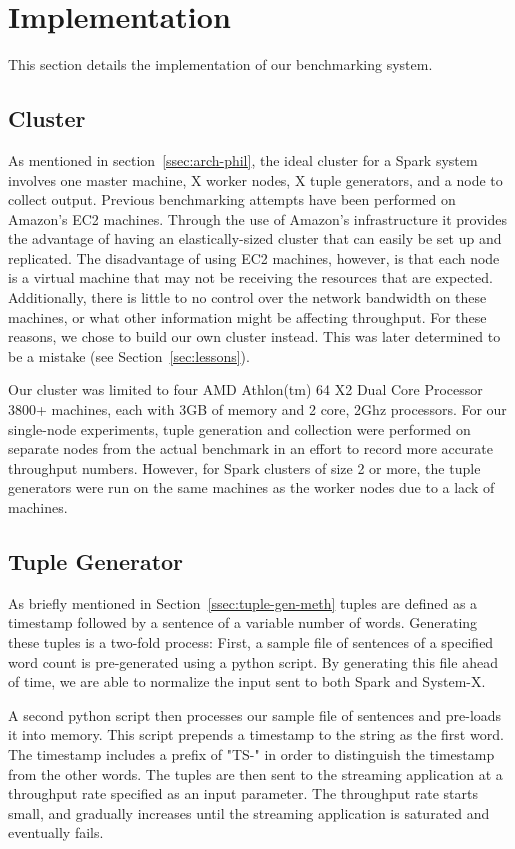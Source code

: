 \section{Implementation}
\label{sec:impl}
This section details the implementation of our benchmarking system.
\subsection{Cluster}
As mentioned in section~\ref{ssec:arch-phil}, the ideal cluster for a Spark system involves one master machine, X worker nodes, X tuple generators, and a node to collect output.  Previous benchmarking attempts have been performed on Amazon's EC2 machines.  Through the use of Amazon's infrastructure it provides the advantage of having an elastically-sized cluster that can easily be set up and replicated.  The disadvantage of using EC2 machines, however, is that each node is a virtual machine that may not be receiving the resources that are expected.  Additionally, there is little to no control over the network bandwidth on these machines, or what other information might be affecting throughput.  For these reasons, we chose to build our own cluster instead.  This was later determined to be a mistake (see Section~\ref{sec:lessons}).

Our cluster was limited to four AMD Athlon(tm) 64 X2 Dual Core Processor 3800+ machines, each with 3GB of memory and 2 core, 2Ghz processors.  For our single-node experiments, tuple generation and collection were performed on separate nodes from the actual benchmark in an effort to record more accurate throughput numbers.  However, for Spark clusters of size 2 or more, the tuple generators were run on the same machines as the worker nodes due to a lack of machines.

\subsection{Tuple Generator}
As briefly mentioned in Section~\ref{ssec:tuple-gen-meth} tuples are defined as a timestamp followed by a sentence of a variable number of words.  Generating these tuples is a two-fold process:  First, a sample file of sentences of a specified word count is pre-generated using a python script.  By generating this file ahead of time, we are able to normalize the input sent to both Spark and System-X.

A second python script then processes our sample file of sentences and pre-loads it into memory.  This script prepends a timestamp to the string as the first word.  The timestamp includes a prefix of "TS-" in order to distinguish the timestamp from the other words.  The tuples are then sent to the streaming application at a throughput rate specified as an input parameter.  The throughput rate starts small, and gradually increases until the streaming application is saturated and eventually fails.

